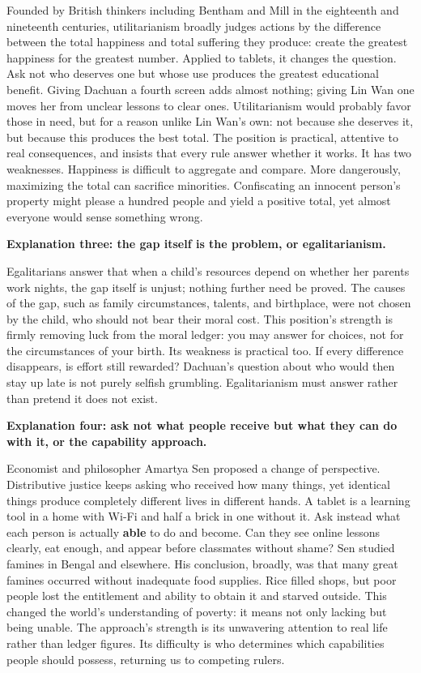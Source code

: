 Founded by British thinkers including Bentham and Mill in the eighteenth and nineteenth centuries, utilitarianism broadly judges actions by the difference between the total happiness and total suffering they produce: create the greatest happiness for the greatest number. Applied to tablets, it changes the question. Ask not who deserves one but whose use produces the greatest educational benefit. Giving Dachuan a fourth screen adds almost nothing; giving Lin Wan one moves her from unclear lessons to clear ones. Utilitarianism would probably favor those in need, but for a reason unlike Lin Wan's own: not because she deserves it, but because this produces the best total. The position is practical, attentive to real consequences, and insists that every rule answer whether it works. It has two weaknesses. Happiness is difficult to aggregate and compare. More dangerously, maximizing the total can sacrifice minorities. Confiscating an innocent person's property might please a hundred people and yield a positive total, yet almost everyone would sense something wrong.

\textbf{Explanation three: the gap itself is the problem, or egalitarianism.}

Egalitarians answer that when a child's resources depend on whether her parents work nights, the gap itself is unjust; nothing further need be proved. The causes of the gap, such as family circumstances, talents, and birthplace, were not chosen by the child, who should not bear their moral cost. This position's strength is firmly removing luck from the moral ledger: you may answer for choices, not for the circumstances of your birth. Its weakness is practical too. If every difference disappears, is effort still rewarded? Dachuan's question about who would then stay up late is not purely selfish grumbling. Egalitarianism must answer rather than pretend it does not exist.

\textbf{Explanation four: ask not what people receive but what they can do with it, or the capability approach.}

Economist and philosopher Amartya Sen proposed a change of perspective. Distributive justice keeps asking who received how many things, yet identical things produce completely different lives in different hands. A tablet is a learning tool in a home with Wi-Fi and half a brick in one without it. Ask instead what each person is actually \textbf{able} to do and become. Can they see online lessons clearly, eat enough, and appear before classmates without shame? Sen studied famines in Bengal and elsewhere. His conclusion, broadly, was that many great famines occurred without inadequate food supplies. Rice filled shops, but poor people lost the entitlement and ability to obtain it and starved outside. This changed the world's understanding of poverty: it means not only lacking but being unable. The approach's strength is its unwavering attention to real life rather than ledger figures. Its difficulty is who determines which capabilities people should possess, returning us to competing rulers.

